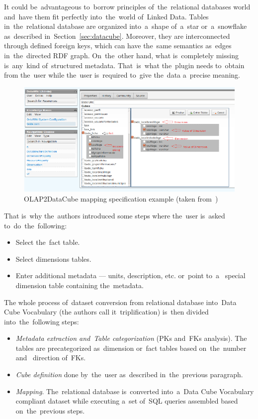 It could be~advantageous to~borrow principles of~the~relational databases world and~have them
fit perfectly into~the~world of~Linked Data. Tables in~the~relational database 
are organized into~a~shape of~a~star or~a~snowflake as~described in~Section~\ref{sec:datacube}.
Moreover, they are interconnected through defined foreign keys,
which can have the~same semantics as~edges in~the~directed RDF graph.
On~the~other hand, what is~completely missing is~any~kind of~structured
metadata. That~is~what the~plugin needs to~obtain from the~user while the~user
is~required to~give the~data a~precise meaning.

\begin{figure}
	\centering
	\includegraphics[width=140mm]{img/olapimport.png}
	\caption{OLAP2DataCube mapping specification example (taken from~\cite{olap2dc-paper})}
	\label{fig:olap2dc-screen}
\end{figure}

\begin{sloppypar}
That is~why the~authors introduced some steps where the~user is~asked to~do~the~following:
\begin{itemize}
  \item Select the~fact table.
  \item Select dimensions tables.
  \item Enter additional metadata --- units, description, etc. or~point to~a~  special dimension table containing the~metadata.
\end{itemize}

The whole process of~dataset conversion from relational database into~Data Cube Vocabulary
(the authors call it~triplification) is~then divided into~the~following steps:
\begin{itemize}
  \item \emph{Metadata extraction and~Table categorization} (PKs and~FKs analysis). The~  tables are precategorized as~dimension or~fact tables based on~the~number and~  direction of~FKs.
  \item \emph{Cube definition} done by~the~user as~described in~the~previous paragraph.
  \item \emph{Mapping}. The~relational database is~converted into~a~Data Cube 
  Vocabulary compliant dataset while executing a~set of~SQL queries assembled 
  based on~the~previous steps.
\end{itemize}
\end{sloppypar}

